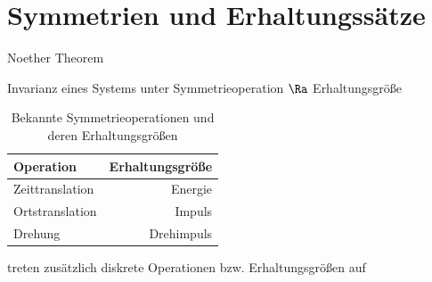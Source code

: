 \section{Symmetrien und Erhaltungssätze}
 Noether Theorem
\begin{framed}
\begin{center}
Invarianz eines Systems unter Symmetrieoperation $\Ra$ Erhaltungsgröße
\end{center}
\end{framed}
\begin{table}[!ht]
\centering
\begin{tabular}{l|r}
Operation & Erhaltungsgröße\\
\hline
Zeittranslation & Energie\\
Ortstranslation & Impuls\\
Drehung & Drehimpuls
\end{tabular}
\caption{Bekannte Symmetrieoperationen und deren Erhaltungsgrößen}
\end{table}
 treten zusätzlich diskrete Operationen bzw. Erhaltungsgrößen auf

